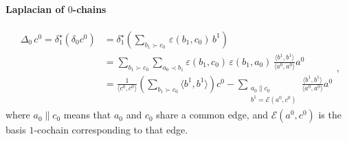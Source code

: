 \documentclass{elsarticle}
\theoremstyle{definition}
\newcommand{\inner}[2]{\langle#1,#2\rangle}
\begin{document}
\paragraph{Laplacian of $0$-chains}
\begin{equation}
\label{eq:laplacian}
  \begin{split}
    \Delta_0\, c^0 = \delta^\star_1 (\delta_0 c^0)
      & = \delta^\star_1 \left( \sum_{b_1 \succ c_0}\, \varepsilon(b_1, c_0)\, b^1 \right) \\
      & = \sum_{b_1 \succ c_0} \sum_{a_0 \prec b_1} \varepsilon(b_1, c_0)\, \varepsilon(b_1, a_0)\, \frac{\inner{b^1}{b^1}}{\inner{a^0}{a^0}} a^0 \\
      & = \frac{1}{\inner{c^0}{c^0}} \left(\sum_{b_1 \succ c_0} \inner{b^1}{b^1} \right) c^0 
        - \sum_{\substack{a_0 \parallel c_0 \\ b^1 = \mathcal{E}(a^0, c^0)}} \frac{\inner{b^1}{b^1}}{\inner{a^0}{a^0}} a^0
  \end{split},
\end{equation}
where $a_0 \parallel c_0$ means that $a_0$ and $c_0$ share a common edge, and $\mathcal{E}(a^0, c^0)$ is the basis $1$-cochain corresponding to that edge.
\end{document}
